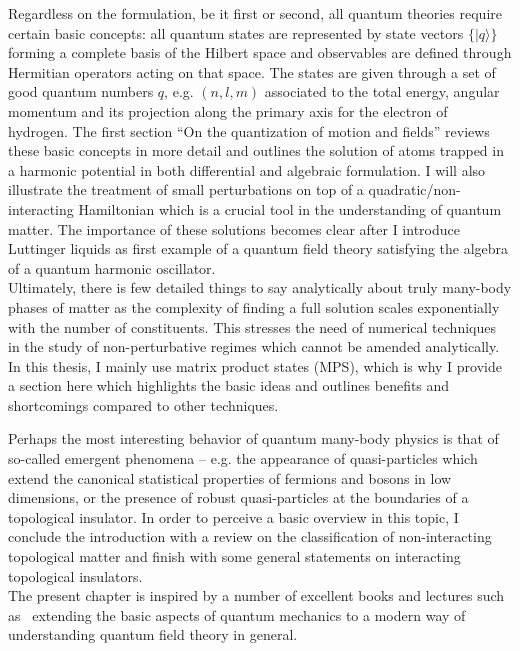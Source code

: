 Regardless on the formulation, be it first or second, all quantum theories require certain basic concepts:
all quantum states are represented by state vectors $\{|q\rangle\}$ forming a complete basis of the Hilbert space and observables are defined through Hermitian operators acting on that space.
The states are given through a set of good quantum numbers $q$, e.g. $(n,l,m)$ associated to the total energy, angular momentum and its projection along the primary axis for the electron of hydrogen.
The first section ``On the quantization of motion and fields'' reviews these basic concepts in more detail and outlines the solution of atoms trapped in a harmonic potential in both differential and algebraic formulation.
I will also illustrate the treatment of small perturbations on top of a quadratic/non-interacting Hamiltonian which is a crucial tool in the understanding of quantum matter.
The importance of these solutions becomes clear after I introduce Luttinger liquids as first example of a quantum field theory satisfying the algebra of a quantum harmonic oscillator.
\\

Ultimately, there is few detailed things to say analytically about truly many-body phases of matter as the complexity of finding a full solution scales exponentially with the number of constituents.
This stresses the need of numerical techniques in the study of non-perturbative regimes which cannot be amended analytically.
In this thesis, I mainly use matrix product states (MPS), which is why I provide a section here which highlights the basic ideas and outlines benefits and shortcomings compared to other techniques.

Perhaps the most interesting behavior of quantum many-body physics is that of so-called emergent phenomena -- e.g. the appearance of quasi-particles which extend the canonical statistical properties of fermions and bosons in low dimensions, or the presence of robust quasi-particles at the boundaries of a topological insulator.
In order to perceive a basic overview in this topic, I conclude the introduction with a review on the classification of non-interacting topological matter and finish with some general statements on interacting topological insulators.
\\

The present chapter is inspired by a number of excellent books and lectures such as~\cite{AshcroftMermin1978,AltlandSimons2010,BruusFlensberg2004,Czycholl2016,FetterWalecka2003,Giamarchi2003,Rizzi2016,Burrello2020} extending the basic aspects of quantum mechanics to a modern way of understanding quantum field theory in general.
%
%
